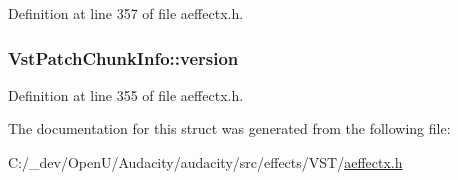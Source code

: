 Definition at line 357 of file aeffectx.\+h.

\subsubsection[{\texorpdfstring{version}{version}}]{ Vst\+Patch\+Chunk\+Info\+::version}\hypertarget{struct_vst_patch_chunk_info_a09942223afdb9472fadab3247692cc1c}{}\label{struct_vst_patch_chunk_info_a09942223afdb9472fadab3247692cc1c}


Definition at line 355 of file aeffectx.\+h.



The documentation for this struct was generated from the following file\+:\begin{DoxyCompactItemize}
\item 
C\+:/\+\_\+dev/\+Open\+U/\+Audacity/audacity/src/effects/\+V\+S\+T/\hyperlink{aeffectx_8h}{aeffectx.\+h}\end{DoxyCompactItemize}
